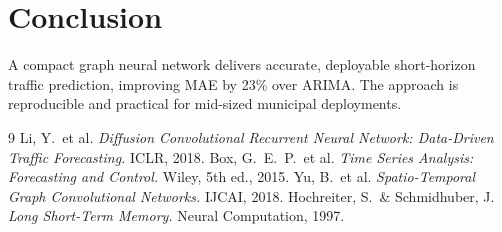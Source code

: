 \section{Conclusion}
A compact graph neural network delivers accurate, deployable short-horizon traffic
prediction, improving MAE by 23\% over ARIMA. The approach is reproducible and practical
for mid-sized municipal deployments.

\begin{thebibliography}{9}
\setlength{\itemsep}{2pt}
 Li, Y.\ et al. \textit{Diffusion Convolutional Recurrent Neural Network:
  Data-Driven Traffic Forecasting.} ICLR, 2018.
 Box, G.\ E.\ P.\ et al. \textit{Time Series Analysis: Forecasting and
  Control.} Wiley, 5th ed., 2015.
 Yu, B.\ et al. \textit{Spatio-Temporal Graph Convolutional Networks.}
  IJCAI, 2018.
 Hochreiter, S.\ \& Schmidhuber, J. \textit{Long Short-Term
  Memory.} Neural Computation, 1997.
\end{thebibliography}
